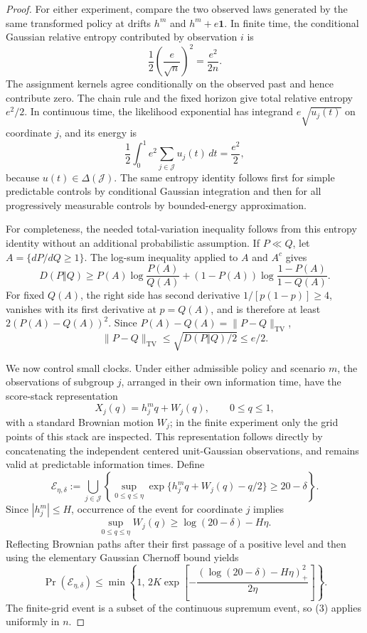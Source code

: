 \documentclass{article}
\begin{document}
\begin{proof}
For either experiment, compare the two observed laws generated by the same transformed policy at drifts \(h^m\) and \(h^m+e\mathbf 1\).  In finite time, the conditional Gaussian relative entropy contributed by observation \(i\) is
\[
\frac12\left(\frac e{\sqrt n}\right)^2=\frac{e^2}{2n}.
\]
The assignment kernels agree conditionally on the observed past and hence contribute zero.  The chain rule and the fixed horizon give total relative entropy \(e^2/2\).  In continuous time, the likelihood exponential has integrand \(e\sqrt{u_j(t)}\) on coordinate \(j\), and its energy is
\[
\frac12\int_0^1 e^2\sum_{j\in\mathcal J}u_j(t)\,dt
=\frac{e^2}{2},
\]
because \(u(t)\in\Delta(\mathcal J)\).  The same entropy identity follows first for simple predictable controls by conditional Gaussian integration and then for all progressively measurable controls by bounded-energy approximation.

For completeness, the needed total-variation inequality follows from this entropy identity without an additional probabilistic assumption.  If \(P\ll Q\), let \(A=\{dP/dQ\geq1\}\).  The log-sum inequality applied to \(A\) and \(A^c\) gives
\[
D(P\Vert Q)\geq
P(A)\log\frac{P(A)}{Q(A)}
+(1-P(A))\log\frac{1-P(A)}{1-Q(A)}.
\]
For fixed \(Q(A)\), the right side has second derivative
\(1/[p(1-p)]\geq4\), vanishes with its first derivative at
\(p=Q(A)\), and is therefore at least
\(2(P(A)-Q(A))^2\).  Since \(P(A)-Q(A)=\lVert P-Q\rVert_{\mathrm{TV}}\),
\[
\lVert P-Q\rVert_{\mathrm{TV}}\leq\sqrt{D(P\Vert Q)/2}\leq e/2.
\tag{2}
\]

We now control small clocks.  Under either admissible policy and scenario \(m\), the observations of subgroup \(j\), arranged in their own information time, have the score-stack representation
\[
X_j(q)=h_j^m q+W_j(q),\qquad 0\leq q\leq1,
\]
with a standard Brownian motion \(W_j\); in the finite experiment only the grid points of this stack are inspected.  This representation follows directly by concatenating the independent centered unit-Gaussian observations, and remains valid at predictable information times.  Define
\[
\mathcal E_{\eta,\delta}
:=\bigcup_{j\in\mathcal J}
\left\{\sup_{0\leq q\leq\eta}
\exp\{h_j^m q+W_j(q)-q/2\}\geq20-\delta\right\}.
\]
Since \(|h_j^m|\leq H\), occurrence of the event for coordinate \(j\) implies
\[
\sup_{0\leq q\leq\eta}W_j(q)
\geq \log(20-\delta)-H\eta.
\]
Reflecting Brownian paths after their first passage of a positive level and then using the elementary Gaussian Chernoff bound yields
\[
\Pr(\mathcal E_{\eta,\delta})
\leq
\min\left\{1,\,
2K\exp\!\left[
-\frac{(\log(20-\delta)-H\eta)_+^2}{2\eta}
\right]\right\}.
\tag{3}
\]
The finite-grid event is a subset of the continuous supremum event, so (3) applies uniformly in \(n\).


\end{proof}
\end{document}
